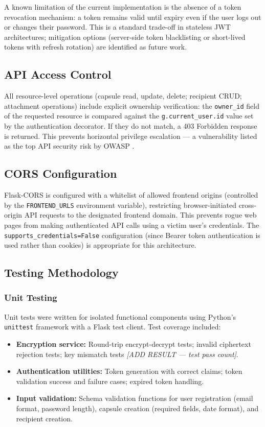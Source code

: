 \documentclass[12pt, a4paper]{article}
\begin{document}
A known limitation of the current implementation is the absence of a token revocation mechanism: a token remains valid until expiry even if the user logs out or changes their password. This is a standard trade-off in stateless JWT architectures; mitigation options (server-side token blacklisting or short-lived tokens with refresh rotation) are identified as future work.

\subsection{API Access Control}

All resource-level operations (capsule read, update, delete; recipient CRUD; attachment operations) include explicit ownership verification: the \texttt{owner\_id} field of the requested resource is compared against the \texttt{g.current\_user.id} value set by the authentication decorator. If they do not match, a 403 Forbidden response is returned. This prevents horizontal privilege escalation — a vulnerability listed as the top API security risk by OWASP \cite{owasp2023}.

\subsection{CORS Configuration}

Flask-CORS is configured with a whitelist of allowed frontend origins (controlled by the \texttt{FRONTEND\_URLS} environment variable), restricting browser-initiated cross-origin API requests to the designated frontend domain. This prevents rogue web pages from making authenticated API calls using a victim user's credentials. The \texttt{supports\_credentials=False} configuration (since Bearer token authentication is used rather than cookies) is appropriate for this architecture.

\subsection{Testing Methodology}

\subsubsection{Unit Testing}

Unit tests were written for isolated functional components using Python's \texttt{unittest} framework with a Flask test client. Test coverage included:

\begin{itemize}
  \item \textbf{Encryption service:} Round-trip encrypt-decrypt tests; invalid ciphertext rejection tests; key mismatch tests \textit{[ADD RESULT — test pass count]}.
  \item \textbf{Authentication utilities:} Token generation with correct claims; token validation success and failure cases; expired token handling.
  \item \textbf{Input validation:} Schema validation functions for user registration (email format, password length), capsule creation (required fields, date format), and recipient creation.
\end{itemize}
\end{document}
